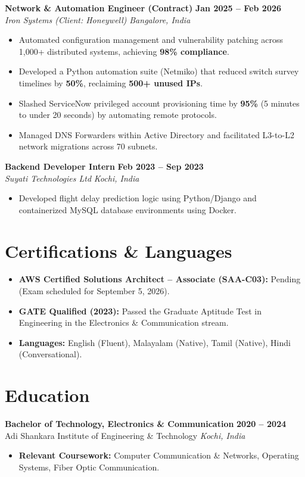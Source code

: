 \documentclass[10pt,letterpaper]{article}
\begin{document}
\textbf{Network \& Automation Engineer (Contract)} \hfill \textbf{Jan 2025 -- Feb 2026}\\
\textit{Iron Systems (Client: Honeywell)} \hfill \textit{Bangalore, India}
\begin{itemize}[leftmargin=1.5em, itemsep=1pt, parsep=0pt]
    \item Automated configuration management and vulnerability patching across 1,000+ distributed systems, achieving \textbf{98\% compliance}.
    \item Developed a Python automation suite (Netmiko) that reduced switch survey timelines by \textbf{50\%}, reclaiming \textbf{500+ unused IPs}.
    \item Slashed ServiceNow privileged account provisioning time by \textbf{95\%} (5 minutes to under 20 seconds) by automating remote protocols.
    \item Managed DNS Forwarders within Active Directory and facilitated L3-to-L2 network migrations across 70 subnets.
\end{itemize}

\textbf{Backend Developer Intern} \hfill \textbf{Feb 2023 -- Sep 2023}\\
\textit{Suyati Technologies Ltd} \hfill \textit{Kochi, India}
\begin{itemize}[leftmargin=1.5em, itemsep=1pt, parsep=0pt]
    \item Developed flight delay prediction logic using Python/Django and containerized MySQL database environments using Docker.
\end{itemize}

\section{Certifications \& Languages}
\begin{itemize}[leftmargin=1.5em, itemsep=1pt, parsep=0pt]
    \item \textbf{AWS Certified Solutions Architect -- Associate (SAA-C03):} Pending (Exam scheduled for September 5, 2026).
    \item \textbf{GATE Qualified (2023):} Passed the Graduate Aptitude Test in Engineering in the Electronics \& Communication stream.
    \item \textbf{Languages:} English (Fluent), Malayalam (Native), Tamil (Native), Hindi (Conversational).
\end{itemize}

\section{Education}

\textbf{Bachelor of Technology, Electronics \& Communication} \hfill \textbf{2020 -- 2024}\\
Adi Shankara Institute of Engineering \& Technology \hfill \textit{Kochi, India}
\begin{itemize}[leftmargin=1.5em, itemsep=1pt, parsep=0pt]
    \item \textbf{Relevant Coursework:} Computer Communication \& Networks, Operating Systems, Fiber Optic Communication.
\end{itemize}
\end{document}
